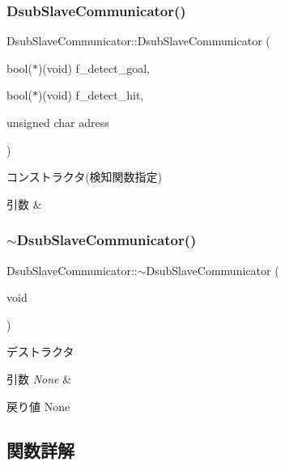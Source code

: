 \subsubsection{\texorpdfstring{DsubSlaveCommunicator()}{DsubSlaveCommunicator()}\hspace{0.1cm}{\footnotesize\ttfamily [2/2]}}
{\footnotesize\ttfamily Dsub\+Slave\+Communicator\+::\+Dsub\+Slave\+Communicator (\begin{DoxyParamCaption}\item[{bool($\ast$)(void)}]{f\+\_\+detect\+\_\+goal,  }\item[{bool($\ast$)(void)}]{f\+\_\+detect\+\_\+hit,  }\item[{unsigned char}]{adress }\end{DoxyParamCaption})}



コンストラクタ(検知関数指定) 


\begin{DoxyParams}{引数}
{\em } & \\
\hline
\end{DoxyParams}
\mbox{\label{class_dsub_slave_communicator_af3369086cde883a07f686203a41aab13}} 
\subsubsection{\texorpdfstring{$\sim$DsubSlaveCommunicator()}{~DsubSlaveCommunicator()}}
{\footnotesize\ttfamily Dsub\+Slave\+Communicator\+::$\sim$\+Dsub\+Slave\+Communicator (\begin{DoxyParamCaption}\item[{void}]{ }\end{DoxyParamCaption})}



デストラクタ 


\begin{DoxyParams}{引数}
{\em None} & \\
\hline
\end{DoxyParams}
\begin{DoxyReturn}{戻り値}
None 
\end{DoxyReturn}


\subsection{関数詳解}
\mbox{\label{class_dsub_slave_communicator_aef578741915e2e109b7b4d7813693cfe}} 
